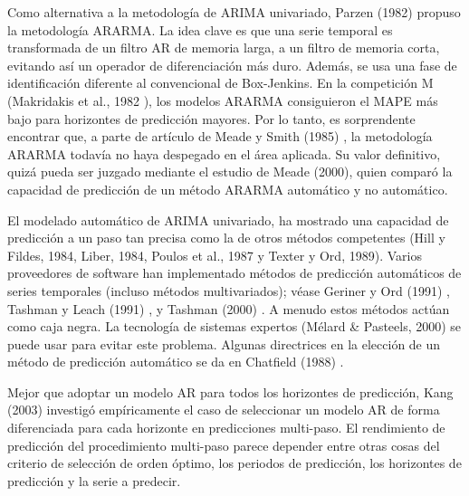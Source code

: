 \documentclass{llncs}
\begin{document}
Como alternativa a la metodología de ARIMA univariado, Parzen (1982) \cite{Parzen198267} propuso la metodología ARARMA. La idea clave es que una serie temporal es transformada de un filtro AR de memoria larga, a un filtro de memoria corta, evitando así un operador de diferenciación más duro. Además, se usa una fase de identificación diferente al convencional de Box-Jenkins. En la competición M (Makridakis et al., 1982 \cite{Makridakis1982111}), los modelos ARARMA consiguieron el MAPE más bajo para horizontes de predicción mayores. Por lo tanto, es sorprendente encontrar que, a parte de artículo de Meade y Smith (1985) \cite{Meade1985519}, la metodología ARARMA todavía no haya despegado en el área aplicada. Su valor definitivo, quizá pueda ser juzgado mediante el estudio  de Meade (2000), quien comparó la capacidad de predicción de un método ARARMA automático y no automático.

El modelado automático de ARIMA univariado, ha mostrado una capacidad de predicción a un paso tan precisa como la de otros métodos competentes (Hill y Fildes, 1984, Liber, 1984, Poulos et al., 1987 y Texter y Ord, 1989). Varios proveedores de software han implementado métodos de predicción automáticos de series temporales (incluso métodos multivariados); véase Geriner y Ord (1991) \cite{Geriner1991127}, Tashman y Leach (1991) \cite{Tashman1991209}, y Tashman (2000) \cite{Tashman2000437}. A menudo estos métodos actúan como caja negra. La tecnología de sistemas expertos (Mélard \& Pasteels, 2000) se puede usar para evitar este problema. Algunas directrices en la elección de un método de predicción automático se da en Chatfield (1988) \cite{Chatfield198819}.

Mejor que adoptar un modelo AR para todos los horizontes de predicción, Kang (2003) \cite{Kang2003387} investigó empíricamente el caso de seleccionar un modelo AR  de forma diferenciada para cada horizonte en predicciones multi-paso.
El rendimiento de predicción del procedimiento multi-paso parece depender entre otras cosas del criterio de selección de orden óptimo, los periodos de predicción, los horizontes de predicción y la serie a predecir.
\end{document}
